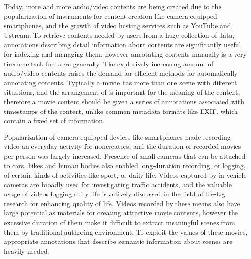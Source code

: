 Today, more and more audio/video contents are being created due to the popularization of instruments for content creation like camera-equipped smartphones, and the growth of video hosting services such as YouTube and Ustream.
To retrieve contents needed by users from a huge collection of data, annotations describing detail information about contents are significantly useful for indexing and managing them, however annotating contents manually is a very tiresome task for users generally.
The explosively increasing amount of audio/video contents raises the demand for efficient methods for automatically annotating contents.
Typically a movie has more than one scene with different situations, and the arrangement of is important for the meaning of the content, therefore a movie content should be given a series of annotations associated with timestamps of the content, unlike common metadata formats like EXIF, which contain a fixed set of information.

Popularization of camera-equipped devices like smartphones made recording video an everyday activity for noncreators, and the duration of recorded movies per person was largely increased.
Presence of small cameras that can be attached to cars, bikes and human bodies also enabled long-duration recording, or logging, of certain kinds of activities like sport, or daily life.
Videos captured by in-vehicle cameras are broadly used for investigating traffic accidents, and the valuable usage of videos logging daily life is actively discussed in the field of life-log research for enhancing quality of life.
Videos recorded by these means also have large potential as materials for creating attractive movie contents, however the excessive duration of them make it difficult to extract meaningful scenes from them by traditional authoring environment.
To exploit the values of these movies, appropriate annotations that describe semantic information about scenes are heavily needed.

